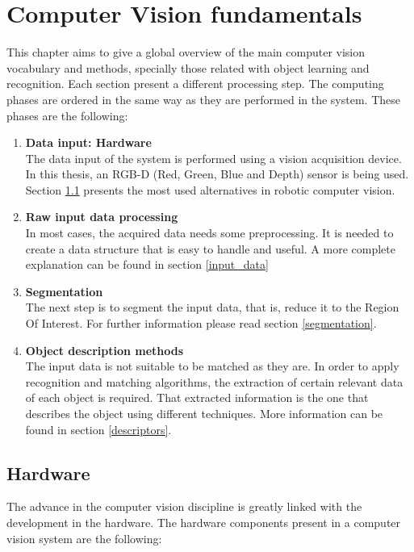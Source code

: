 \chapter{Computer Vision fundamentals}
\label{fundamentals}
This chapter aims to give a global overview of the main computer vision vocabulary and methods, specially those related with object learning and recognition. 
Each section present a different processing step. 
The computing phases are ordered in the same way as they are performed in the system. 
These phases are the following: 
\begin {enumerate}
	\item{\textbf{Data input: Hardware} \\}
	The data input of the system is performed using a vision acquisition device. 
	In this thesis, an RGB-D (Red, Green, Blue and Depth) sensor is being used. 
	Section \ref{hardware} presents the most used alternatives in robotic computer vision. 

	\item{\textbf{Raw input data processing}\\}
	In most cases, the acquired data needs some preprocessing. 
	It is needed to create a data structure that is easy to handle and useful. 
	A more complete explanation can be found in section \ref{input_data}

	\item{\textbf{Segmentation}\\}
	The next step is to segment the input data, that is, reduce it to the Region Of Interest. 
	For further information please read section \ref{segmentation}.

	\item{\textbf{Object description methods}\\}
	The input data is not suitable to be matched as they are. 
	In order to apply recognition and matching algorithms, the extraction of certain relevant data of each object is required. 
	That extracted information is the one that describes the object using different techniques. 
	More information can be found in section \ref{descriptors}.
\end{enumerate}


\section{Hardware}
\label{hardware}
The advance in the computer vision discipline is greatly linked with the development in the hardware. 
The hardware components present in a computer vision system are the following: 

